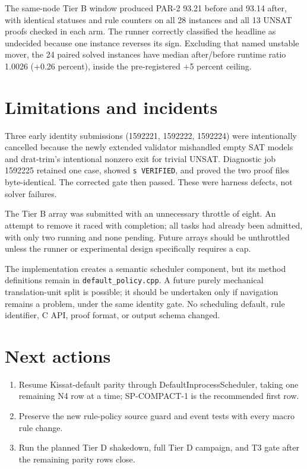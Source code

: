 \documentclass[11pt]{article}
\begin{document}
The same-node Tier B window produced PAR-2 93.21 before and 93.14 after, with
identical statuses and rule counters on all 28 instances and all 13 UNSAT proofs
checked in each arm.  The runner correctly classified the headline as undecided
because one instance reverses its sign.  Excluding that named unstable mover,
the 24 paired solved instances have median after/before runtime ratio 1.0026
(+0.26 percent), inside the pre-registered +5 percent ceiling.

\section{Limitations and incidents}
Three early identity submissions (1592221, 1592222, 1592224) were intentionally
cancelled because the newly extended validator mishandled empty SAT models and
drat-trim's intentional nonzero exit for trivial UNSAT.  Diagnostic job 1592225
retained one case, showed \texttt{s VERIFIED}, and proved the two proof files
byte-identical.  The corrected gate then passed.  These were harness defects,
not solver failures.

The Tier B array was submitted with an unnecessary throttle of eight.  An
attempt to remove it raced with completion; all tasks had already been admitted,
with only two running and none pending.  Future arrays should be unthrottled
unless the runner or experimental design specifically requires a cap.

The implementation creates a semantic scheduler component, but its method
definitions remain in \texttt{default\_policy.cpp}.  A future purely mechanical
translation-unit split is possible; it should be undertaken only if navigation
remains a problem, under the same identity gate.  No scheduling default, rule
identifier, C API, proof format, or output schema changed.

\section{Next actions}
\begin{enumerate}
\item Resume Kissat-default parity through DefaultInprocessScheduler, taking one
  remaining N4 row at a time; SP-COMPACT-1 is the recommended first row.
\item Preserve the new rule-policy source guard and event tests with every macro
  rule change.
\item Run the planned Tier D shakedown, full Tier D campaign, and T3 gate after
  the remaining parity rows close.
\end{enumerate}
\end{document}
